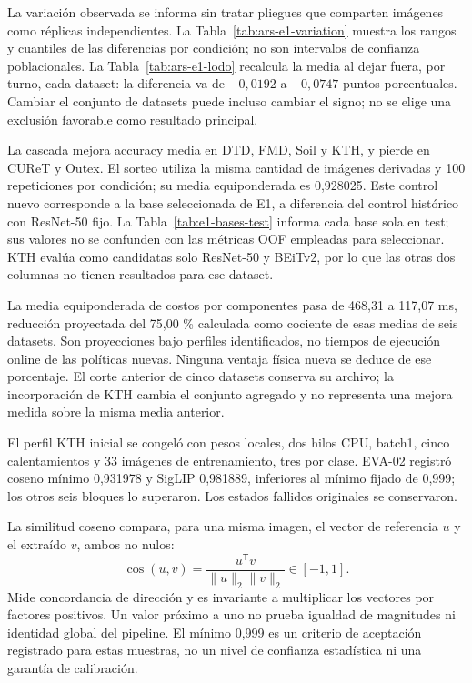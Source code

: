 La variación observada se informa sin tratar pliegues que comparten imágenes como réplicas independientes. La Tabla~\ref{tab:ars-e1-variation} muestra los rangos y cuantiles de las diferencias por condición; no son intervalos de confianza poblacionales. La Tabla~\ref{tab:ars-e1-lodo} recalcula la media al dejar fuera, por turno, cada dataset: la diferencia va de \(-0,0192\) a \(+0,0747\) puntos porcentuales. Cambiar el conjunto de datasets puede incluso cambiar el signo; no se elige una exclusión favorable como resultado principal.






La cascada mejora accuracy media en DTD, FMD, Soil y KTH, y pierde en CUReT y Outex. El sorteo utiliza la misma cantidad de imágenes derivadas y 100 repeticiones por condición; su media equiponderada es 0,928025. Este control nuevo corresponde a la base seleccionada de E1, a diferencia del control histórico con ResNet-50 fijo. La Tabla~\ref{tab:e1-bases-test} informa cada base sola en test; sus valores no se confunden con las métricas OOF empleadas para seleccionar. KTH evalúa como candidatas solo ResNet-50 y BEiTv2, por lo que las otras dos columnas no tienen resultados para ese dataset.




La media equiponderada de costos por componentes pasa de 468,31 a 117,07 ms, reducción proyectada del 75,00 \% calculada como cociente de esas medias de seis datasets. Son proyecciones bajo perfiles identificados, no tiempos de ejecución online de las políticas nuevas. Ninguna ventaja física nueva se deduce de ese porcentaje. El corte anterior de cinco datasets conserva su archivo; la incorporación de KTH cambia el conjunto agregado y no representa una mejora medida sobre la misma media anterior.

El perfil KTH inicial se congeló con pesos locales, dos hilos CPU, batch1, cinco calentamientos y 33 imágenes de entrenamiento, tres por clase. EVA-02 registró coseno mínimo 0,931978 y SigLIP 0,981889, inferiores al mínimo fijado de 0,999; los otros seis bloques lo superaron. Los estados fallidos originales se conservaron.

La similitud coseno compara, para una misma imagen, el vector de referencia \(u\) y el extraído \(v\), ambos no nulos:
\begin{equation}
\operatorname{cos}(u,v)=\frac{u^{\mathsf T}v}{\|u\|_2\|v\|_2}\in[-1,1].
\end{equation}
Mide concordancia de dirección y es invariante a multiplicar los vectores por factores positivos. Un valor próximo a uno no prueba igualdad de magnitudes ni identidad global del pipeline. El mínimo 0,999 es un criterio de aceptación registrado para estas muestras, no un nivel de confianza estadística ni una garantía de calibración.

